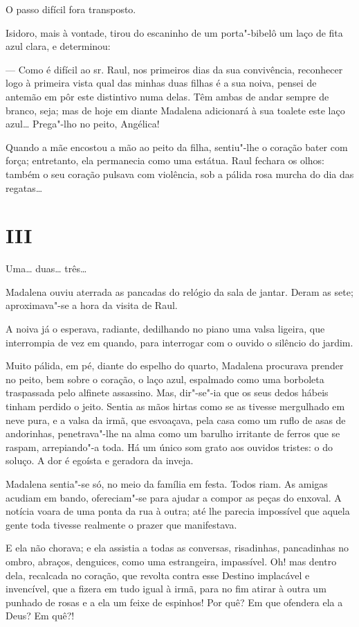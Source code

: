 O passo difícil fora transposto.

Isidoro, mais à vontade, tirou do escaninho de um porta"-bibelô um laço
de fita azul clara, e determinou:

--- Como é difícil ao sr. Raul, nos primeiros dias da sua convivência,
reconhecer logo à primeira vista qual das minhas duas filhas é a sua
noiva, pensei de antemão em pôr este distintivo numa delas. Têm ambas de
andar sempre de branco, seja; mas de hoje em diante Madalena adicionará
à sua toalete este laço azul\ldots{} Prega"-lho no peito, Angélica!

Quando a mãe encostou a mão ao peito da filha, sentiu"-lhe o coração
bater com força; entretanto, ela permanecia como uma estátua. Raul
fechara os olhos: também o seu coração pulsava com violência, sob a
pálida rosa murcha do dia das regatas\ldots{}

\section{III}

Uma\ldots{} duas\ldots{} três\ldots{}

Madalena ouviu aterrada as pancadas do relógio da sala de jantar. Deram
as sete; aproximava"-se a hora da visita de Raul.

A noiva já o esperava, radiante, dedilhando no piano uma valsa ligeira,
que interrompia de vez em quando, para interrogar com o ouvido o
silêncio do jardim.

Muito pálida, em pé, diante do espelho do quarto, Madalena procurava
prender no peito, bem sobre o coração, o laço azul, espalmado como uma
borboleta traspassada pelo alfinete assassino. Mas, dir"-se"-ia que os
seus dedos hábeis tinham perdido o jeito. Sentia as mãos hirtas como se
as tivesse mergulhado em neve pura, e a valsa da irmã, que esvoaçava,
pela casa como um ruflo de asas de andorinhas, penetrava"-lhe na alma
como um barulho irritante de ferros que se raspam, arrepiando"-a toda. Há
um único som grato aos ouvidos tristes: o do soluço. A dor é egoísta e
geradora da inveja.

Madalena sentia"-se só, no meio da família em festa. Todos riam. As
amigas acudiam em bando, ofereciam"-se para ajudar a compor as peças do
enxoval. A notícia voara de uma ponta da rua à outra; até lhe parecia
impossível que aquela gente toda tivesse realmente o prazer que
manifestava.

E ela não chorava; e ela assistia a todas as conversas, risadinhas,
pancadinhas no ombro, abraços, denguices, como uma estrangeira,
impassível. Oh! mas dentro dela, recalcada no coração, que revolta
contra esse Destino implacável e invencível, que a fizera em tudo igual
à irmã, para no fim atirar à outra um punhado de rosas e a ela um feixe
de espinhos! Por quê? Em que ofendera ela a Deus? Em quê?!

